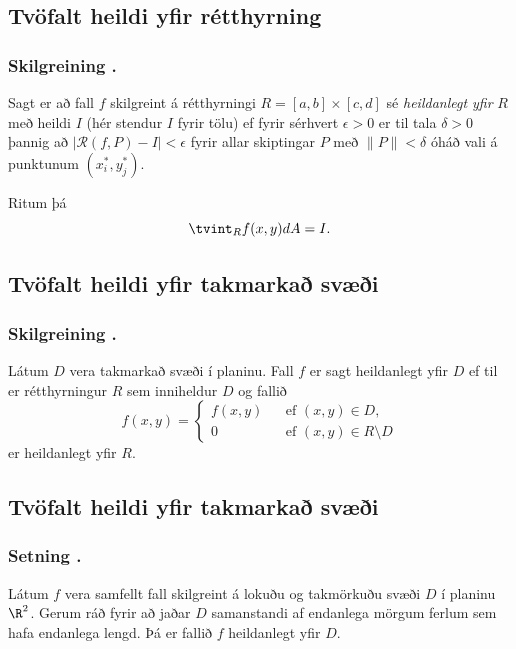 \subsection{\nopagebreak Tvöfalt heildi yfir rétthyrning} 

\subsubsection{\nopagebreak Skilgreining \kaflanr.}
Sagt er að fall $f$ skilgreint á
rétthyrningi $R=[a,b]\times [c,d]$ sé {\em heildanlegt yfir} $R$ með
heildi $I$ (hér stendur $I$ fyrir tölu) ef fyrir sérhvert
$\epsilon>0$ er til tala $\delta>0$ 
þannig að $|\mathcal{R}(f,P)-I|<\epsilon$ fyrir allar skiptingar $P$ með
$\|P\|<\delta$ óháð vali á punktunum $(x_i^*, y_j^*)$.

Ritum þá 
$$\tvint_R f(x,y)dA=I.$$






\subsection{Tvöfalt heildi yfir takmarkað svæði} 

\subsubsection{Skilgreining \kaflanr.}
Látum $D$ vera takmarkað svæði í planinu.
Fall $f$ er sagt heildanlegt yfir $D$ ef til er rétthyrningur $R$ sem
inniheldur $D$ og fallið 
$$\hat{f}(x,y)=\left\{\begin{array}{rcl}
f(x,y)& & \mbox{ef }(x,y)\in D,\\
0& & \mbox{ef }(x,y)\in R\setminus D
\end{array}\right.$$
er heildanlegt yfir $R$.





\subsection{Tvöfalt heildi yfir takmarkað svæði} 

\subsubsection{Setning \kaflanr.}
Látum $f$ vera samfellt fall skilgreint á
lokuðu og takmörkuðu svæði $D$ í planinu $\R^2$.  Gerum ráð fyrir að
jaðar $D$ samanstandi af endanlega mörgum ferlum sem hafa endanlega
lengd.  Þá er fallið $f$ heildanlegt yfir $D$.





